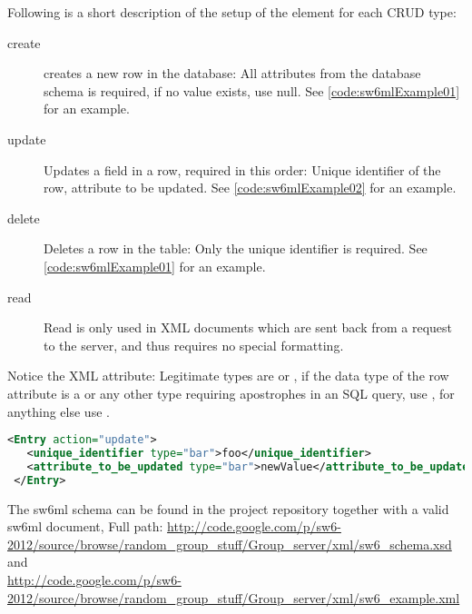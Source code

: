 Following is a short description of the setup of the  element for each CRUD type:

\begin{description}
 \item[create] creates a new row in the database: All attributes from the database schema is required, if no value exists, use null. See \autoref{code:sw6mlExample01} for an example.
 \item[update] Updates a field in a row, required in this order: Unique identifier of the row, attribute to be updated. See \autoref{code:sw6mlExample02} for an example.
 \item[delete] Deletes a row in the table: Only the unique identifier is required. See \autoref{code:sw6mlExample01} for an example.
 \item[read]   Read is only used in XML documents which are sent back from a request to the server, and thus requires no special formatting.
\end{description}

Notice the  XML attribute: Legitimate types are  or , if the data type of the row attribute is a  or any other type requiring apostrophes
in an SQL query, use , for anything else use .

\begin{Code}
\begin{lstlisting}[label=code:sw6mlExample02,language=XML,caption=sw6ml update syntax example]
 <Entry action="update">
   <unique_identifier type="bar">foo</unique_identifier>
   <attribute_to_be_updated type="bar">newValue</attribute_to_be_updated>
 </Entry>
\end{lstlisting}
\end{Code}

The sw6ml schema can be found in the project repository together with a valid sw6ml document,
Full path: \url{http://code.google.com/p/sw6-2012/source/browse/random_group_stuff/Group_server/xml/sw6_schema.xsd}
and \\ \url{http://code.google.com/p/sw6-2012/source/browse/random_group_stuff/Group_server/xml/sw6_example.xml} %